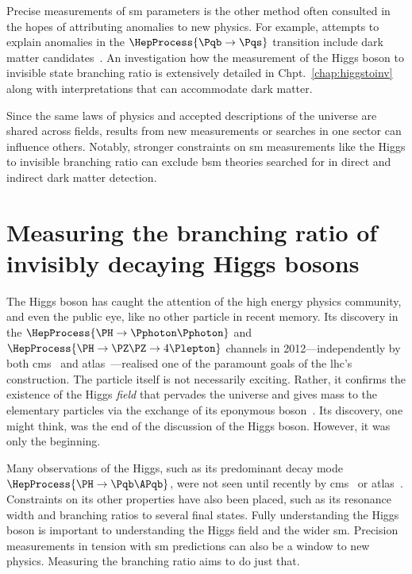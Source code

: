 Precise measurements of \acrlong{sm} parameters is the other method often consulted in the hopes of attributing anomalies to new physics. For example, attempts to explain anomalies in the $\HepProcess{\Pqb \to \Pqs}$ transition include dark matter candidates~\cite{Vicente:2018xbv,another_b_s_anomaly_paper}. An investigation how the measurement of the Higgs boson to invisible state branching ratio is extensively detailed in Chpt.~\ref{chap:higgstoinv} along with interpretations that can accommodate dark matter.

Since the same laws of physics and accepted descriptions of the universe are shared across fields, results from new measurements or searches in one sector can influence others. Notably, stronger constraints on \acrlong{sm} measurements like the Higgs to invisible branching ratio can exclude \acrshort{bsm} theories searched for in direct and indirect dark matter detection.




\section{Measuring the branching ratio of invisibly decaying Higgs bosons}
\label{sec:theory_higgs_to_inv}

The Higgs boson has caught the attention of the high energy physics community, and even the public eye, like no other particle in recent memory. Its discovery in the $\HepProcess{\PH \to \Pphoton\Pphoton}$ and $\HepProcess{\PH \to \PZ\PZ \to \text{4}\Plepton}$ channels in 2012---independently by both \acrshort{cms}~\cite{Chatrchyan:2012xdj} and \acrshort{atlas}~\cite{Aad:2012tfa}---realised one of the paramount goals of the \acrshort{lhc}'s construction. The particle itself is not necessarily exciting. Rather, it confirms the existence of the Higgs \emph{field} that pervades the universe and gives mass to the elementary particles via the exchange of its eponymous boson~\cite{PhysRevLett.13.321,PhysRevLett.13.508,PhysRevLett.13.585}. Its discovery, one might think, was the end of the discussion of the Higgs boson. However, it was only the beginning.

Many observations of the Higgs, such as its predominant decay mode $\HepProcess{\PH \to \Pqb\APqb}$, were not seen until recently by \acrshort{cms}~\cite{Sirunyan:2018kst} or \acrshort{atlas}~\cite{Aaboud:2018zhk}. Constraints on its other properties have also been placed, such as its resonance width and branching ratios to several final states. Fully understanding the Higgs boson is important to understanding the Higgs field and the wider \acrlong{sm}. Precision measurements in tension with \acrshort{sm} predictions can also be a window to new physics. Measuring the \higgstoinv branching ratio aims to do just that.

